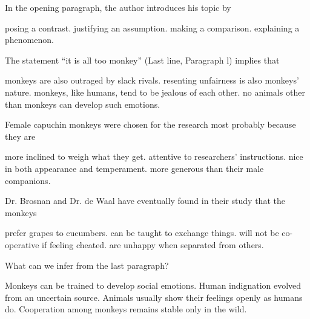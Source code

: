 \item In the opening paragraph, the author introduces his topic by
\begin{tasks}
	\task posing a contrast.
	\task justifying an assumption.
	\task making a comparison.
	\task explaining a phenomenon.
\end{tasks}
\item The statement ``it is all too monkey'' (Last line, Paragraph l) implies that
\begin{tasks}
	\task monkeys are also outraged by slack rivals.
	\task resenting unfairness is also monkeys' nature.
	\task monkeys, like humans, tend to be jealous of each other.
	\task no animals other than monkeys can develop such emotions.
\end{tasks}
\item Female capuchin monkeys were chosen for the research most probably because they are
\begin{tasks}
	\task more inclined to weigh what they get.
	\task attentive to researchers' instructions.
	\task nice in both appearance and temperament.
	\task more generous than their male companions.
\end{tasks}
\item Dr. Brosnan and Dr. de Waal have eventually found in their study that the monkeys
\begin{tasks}
	\task prefer grapes to cucumbers.
	\task can be taught to exchange things.
	\task will not be co-operative if feeling cheated.
	\task are unhappy when separated from others.
\end{tasks}
\item What can we infer from the last paragraph?
\begin{tasks}
	\task Monkeys can be trained to develop social emotions.
	\task Human indignation evolved from an uncertain source.
	\task Animals usually show their feelings openly as humans do.
	\task Cooperation among monkeys remains stable only in the wild.
\end{tasks}